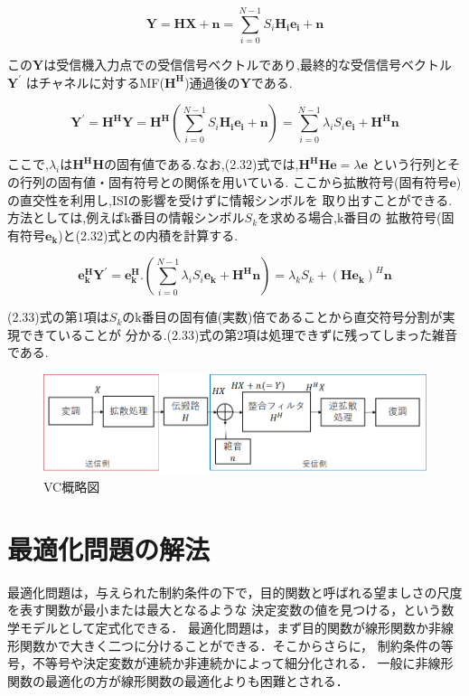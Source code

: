 \begin{equation}
    \bm{Y} = \bm{HX}+\bm{n} = \sum_{i=0}^{N-1} S_i\bm{H_ie_i}+\bm{n}
\end{equation}

この$\bm{Y}$は受信機入力点での受信信号ベクトルであり,最終的な受信信号ベクトル$\bm{Y^{\prime}}$
はチャネルに対するMF($\bm{H^H}$)通過後の$\bm{Y}$である.

\begin{equation}
    \bm{Y^{\prime}}=\bm{H^HY}=\bm{H^H}
    \left(
        \sum_{i=0}^{N-1} S_i\bm{H_ie_i}+\bm{n}
    \right)
    =\sum_{i=0}^{N-1} \lambda_iS_i\bm{e_i}+\bm{H^Hn}
\end{equation}

ここで,$\lambda_i$は$\bm{H^HH}$の固有値である.なお,(2.32)式では,$\bm{H^HHe}=\lambda\bm{e}$
という行列とその行列の固有値・固有符号との関係を用いている.
ここから拡散符号(固有符号$\bm{e}$)の直交性を利用し,ISIの影響を受けずに情報シンボルを
取り出すことができる.方法としては,例えばk番目の情報シンボル$S_k$を求める場合,k番目の
拡散符号(固有符号$\bm{e_k}$)と(2.32)式との内積を計算する.

\begin{equation}
    \bm{e_k^HY^{\prime}}=\bm{e_k^H}.
    \left(
        \sum_{i=0}^{N-1} \lambda_iS_i\bm{e_k}+\bm{H^Hn}
    \right)
    =\lambda_kS_k+(\bm{He_k})^H\bm{n}
\end{equation}

(2.33)式の第1項は$S_k$のk番目の固有値(実数)倍であることから直交符号分割が実現できていることが
分かる.(2.33)式の第2項は処理できずに残ってしまった雑音である.

\begin{figure}
    \centering
    \includegraphics[width=\linewidth]{chapter2/figure/VC.png}
    \caption{VC概略図}
    \label{figVC}
\end{figure}

\section{最適化問題の解法}
最適化問題は，与えられた制約条件の下で，目的関数と呼ばれる望ましさの尺度を表す関数が最小または最大となるような
決定変数の値を見つける，という数学モデルとして定式化できる． \cite{ibaragi}
最適化問題は，まず目的関数が線形関数か非線形関数かで大きく二つに分けることができる．そこからさらに，
制約条件の等号，不等号や決定変数が連続か非連続かによって細分化される．
一般に非線形関数の最適化の方が線形関数の最適化よりも困難とされる．

